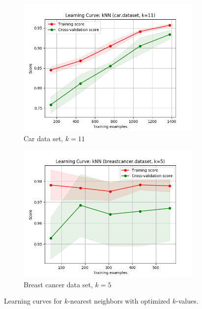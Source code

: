 \documentclass{article}
\begin{document}
    \begin{figure}[htb]
    \centering

    \begin{subfigure}{0.5\textwidth}
      \includegraphics[width=\linewidth]{out/knn/car-k-11.png}
      \caption{Car data set, $k=11$}
      \label{fig:knn-learning-1}
    \end{subfigure}\hfil
    \begin{subfigure}{0.5\textwidth}
      \includegraphics[width=\linewidth]{out/knn/breastcancer-k-5.png}
      \caption{Breast cancer data set, $k=5$}
      \label{fig:knn-learning-2}
    \end{subfigure}

    \caption{Learning curves for $k$-nearest neighbors with optimized $k$-values.}
    \label{fig:knn-learning}
    \end{figure}
\end{document}
